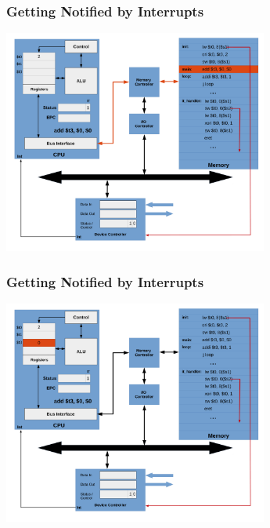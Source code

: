 \documentclass{beamer}
\begin{document}
\begin{frame}[fragile]
\frametitle{Getting Notified by Interrupts}

\begin{center}
\vspace*{-0.23cm}
\hspace*{-1cm}\includegraphics[width=8.7cm]{interrupt_waiting8.pdf}
\end{center}

\end{frame}

\begin{frame}[fragile]
\frametitle{Getting Notified by Interrupts}

\begin{center}
\vspace*{-0.23cm}
\hspace*{-1cm}\includegraphics[width=8.7cm]{interrupt_waiting9.pdf}
\end{center}

\end{frame}
\end{document}
